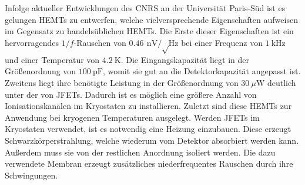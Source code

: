Infolge aktueller Entwicklungen des \ac{CNRS} an der Universität Paris-Süd ist es gelungen HEMTs zu entwerfen, welche vielversprechende Eigenschaften aufweisen im Gegensatz zu handelsüblichen HEMTs.
Die Erste dieser Eigenschaften ist ein hervorragendes $1/f$-Rauschen von $\SI{0.46}{\nano\volt\per\sqrt\hertz}$ bei einer Frequenz von $\SI{1}{\kilo\hertz}$ und einer Temperatur von $\SI{4.2}{\kelvin}$.
Die Eingangskapazität liegt in der Größenordnung von $\SI{100}{\pico\farad}$, womit sie gut an die Detektorkapazität angepasst ist.
Zweitens liegt ihre benötigte Leistung in der Größenordnung von $\SI{30}{\mu\watt}$ deutlich unter der von JFETs.\cite{HEMTYang2011}
Dadurch ist es möglich eine größere Anzahl von Ionisationskanälen im Kryostaten zu installieren.
Zuletzt sind diese HEMTs zur Anwendung bei kryogenen Temperaturen ausgelegt.
Werden JFETs im Kryostaten verwendet, ist es notwendig eine Heizung einzubauen.
Diese erzeugt Schwarzkörperstrahlung, welche wiederum vom Detektor absorbiert werden kann.
Außerdem muss sie von der restlichen Anordnung isoliert werden. 
Die dazu verwendete Membran erzeugt zusätzliches niederfrequentes Rauschen durch ihre Schwingungen.





